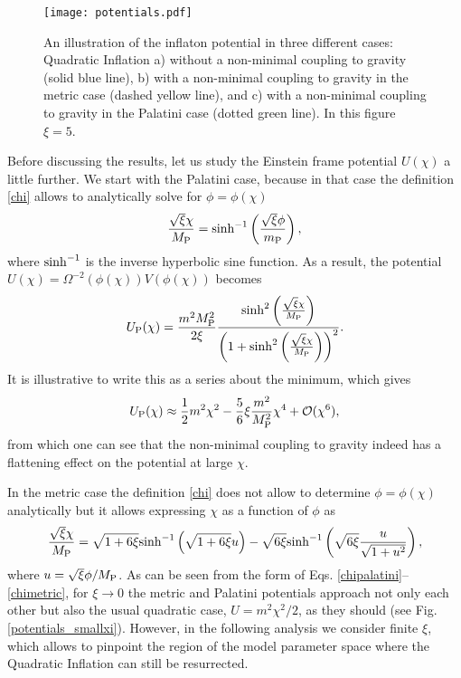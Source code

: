 \documentclass[11pt,a4paper]{article}
\newcommand{\be}{\begin{equation}} %
\newcommand{\ee}{\end{equation}}
\begin{document}
\begin{figure}
\begin{center}
\texttt{[image: potentials.pdf]}
\caption{An illustration of the inflaton potential in three different cases: Quadratic Inflation a) without a non-minimal coupling to gravity (solid blue line), b) with a non-minimal coupling to gravity in the metric case (dashed yellow line), and c) with a non-minimal coupling to gravity in the Palatini case (dotted green line). In this figure $\xi=5$.}
\label{potentials}
\end{center}
\end{figure}

Before discussing the results, let us study the Einstein frame potential $U(\chi)$ a little further. We start with the Palatini case, because in that case the definition \eqref{chi} allows to analytically solve for $\phi=\phi(\chi)$ \cite{Bauer:2008zj} 
\be
\label{chipalatini}
\frac{\sqrt{\xi}\chi}{M_{\rm P}} = {\rm sinh}^{-1}\left(\frac{\sqrt{\xi}\phi}{m_{\rm P}}\right) ,
\ee
where ${\rm sinh}^{-1}$ is the inverse hyperbolic sine function. As a result, the potential $U(\chi) = \Omega^{-2}(\phi(\chi))V(\phi(\chi))$ becomes
\be
\label{palatiniU}
U_{\rm P}(\chi) = \frac{m^2M_{\rm P}^2}{2\xi}\frac{{\rm sinh}^2\left(\frac{\sqrt{\xi}\chi}{M_{\rm P}}\right)}{\left(1+{\rm sinh}^2\left(\frac{\sqrt{\xi}\chi}{M_{\rm P}}\right)\right)^2} .
\ee
It is illustrative to write this as a series about the minimum, which gives
\be
U_{\rm P}(\chi) \approx \frac{1}{2}m^2\chi^2 - \frac{5}{6}\xi\frac{m^2}{M_{\rm P}^2}\chi^4 + \mathcal{O}(\chi^6) ,
\ee
from which one can see that the non-minimal coupling to gravity indeed has a flattening effect on the potential at large $\chi$.

In the metric case the definition \eqref{chi} does not allow to determine $\phi=\phi(\chi)$ analytically but it allows expressing $\chi$ as a function of $\phi$ as \cite{GarciaBellido:2008ab}
\be
\label{chimetric}
\frac{\sqrt{\xi}\chi}{M_{\rm P}} = \sqrt{1+6\xi}{\rm sinh}^{-1}\left(\sqrt{1+6\xi}u\right) - \sqrt{6\xi}{\rm sinh}^{-1}\left(\sqrt{6\xi}\frac{u}{\sqrt{1+u^2}}\right) ,
\ee
where $u=\sqrt{\xi}\phi/M_{\rm P}$. As can be seen from the form of Eqs. \eqref{chipalatini}--\eqref{chimetric}, for $\xi\to 0$ the metric and Palatini potentials approach not only each other but also the usual quadratic case, $U=m^2\chi^2/2$, as they should (see Fig. \ref{potentials_smallxi}). However, in the following analysis we consider finite $\xi$, which allows to pinpoint the region of the model parameter space where the Quadratic Inflation can still be resurrected.
\end{document}
